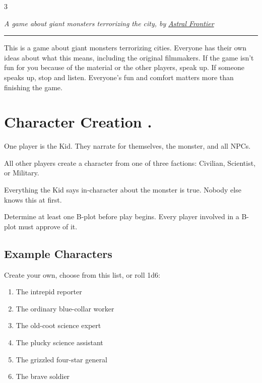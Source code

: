 \documentclass[10pt,oneside,letterpaper,landscape]{memoir}
\newcommand*\toptitle[1]{{\color{titlecolor}\titlefont{#1}}}
\newcommand\rep{\leavevmode\xleaders\hbox{.}\hfill\kern0pt}
\newlength{\currentparskip}
\newenvironment{mpage}[1]{%
        \setlength{\currentparskip}{\parskip}%
             \begin{minipage}{#1}%
         \setlength{\parskip}{\currentparskip}%
    }
{\end{minipage}}
\newcommand{\doublerule}[1][.4pt]{%
  \noindent\color{black!75}
  \makebox[0pt][l]{\rule[.7ex]{\linewidth}{#1}}%
  \rule[.3ex]{\linewidth}{#1}\color{black}\vspace{-1mm}}
\begin{document}
\begin{multicols}{3}
\begin{mpage}{2.13\columnwidth}
 \hspace*{0mm}{\toptitle{Legally Distinct Kaiju RPG}}

\vspace{3mm}

\textit{A game about giant monsters terrorizing the city, by} \textit{\href{https://astralfrontier.itch.io}{Astral Frontier}}

\doublerule

\end{mpage}

\vspace{2mm}

This is a game about giant monsters terrorizing cities. Everyone has their own ideas about what this means, including the original filmmakers. If the game isn't fun for you because of the material or the other players, speak up. If someone speaks up, stop and listen. Everyone's fun and comfort matters more than finishing the game.

\section{Character Creation \rep}

One player is the Kid. They narrate for themselves, the monster, and all NPCs.

All other players create a character from one of three factions: Civilian, Scientist, or Military.

Everything the Kid says in-character about the monster is true. Nobody else knows this at first.

Determine at least one B-plot before play begins. Every player involved in a B-plot must approve of it.

\subsection{Example Characters}

Create your own, choose from this list, or roll 1d6:
\begin{enumerate}
	\item The intrepid reporter
	\item The ordinary blue-collar worker
	\item The old-coot science expert
	\item The plucky science assistant
	\item The grizzled four-star general
	\item The brave soldier
\end{enumerate}


\end{multicols}
\end{document}
